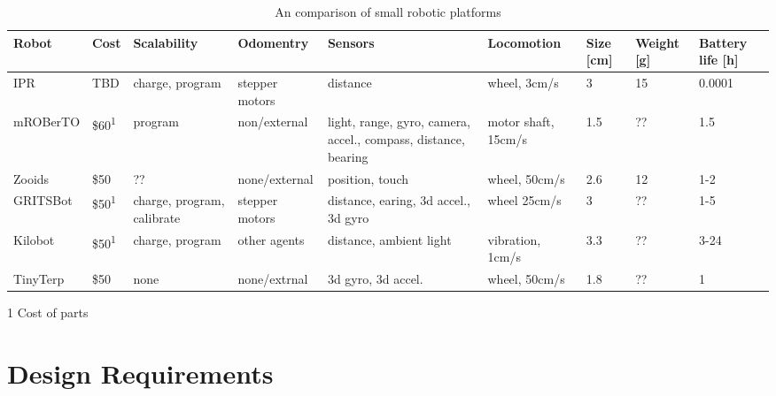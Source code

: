 \documentclass[letterpaper, 10 pt, conference]{ieeeconf}  %
\begin{document}
\begin{table*}[t]
	\centering
	\begin{threeparttable}
		\caption{An comparison of small robotic platforms}
		\label{tab:1}
 		\begin{tabularx}{500pt}{l l X l X l l l l} 
			\hline
 			Robot & Cost & Scalability & Odomentry & Sensors & Locomotion & Size [cm] & Weight [g] & Battery life [h] \\ 
 			\hline
 			IPR & TBD & charge, program & stepper motors & distance & wheel, 3cm/s & 3 & 15 & 0.0001\\
 			mROBerTO \cite{kim_iros_2016} & \$60\textsuperscript{1} & program & non/external & light, range, gyro, camera, accel., compass, distance, bearing & motor shaft, 15cm/s & 1.5 & ?? & 1.5\\
 			Zooids \cite{legoc_uist_2016} & \$50 & ?? & none/external & position, touch & wheel, 50cm/s & 2.6 & 12 & 1-2 \\ 
 			GRITSBot \cite{pickem_icra_2015} & \$50\textsuperscript{1} & charge, program, calibrate & stepper motors & distance, earing, 3d accel., 3d gyro & wheel 25cm/s & 3 & ?? & 1-5 \\
 			Kilobot \cite{rubenstein_icra_2012} & \$50\textsuperscript{1} & charge, program & other agents & distance, ambient light & vibration, 1cm/s & 3.3 & ?? & 3-24\\
 			TinyTerp \cite{sabelhaus_icra_2013} & \$50 & none & none/extrnal & 3d gyro, 3d accel. & wheel, 50cm/s & 1.8 & ?? & 1\\
			\hline
		\end{tabularx}
		\begin{tablenotes}
			\item [1] Cost of parts
		\end{tablenotes}
	\end{threeparttable}
\end{table*}

\section{Design Requirements}



\end{document}
